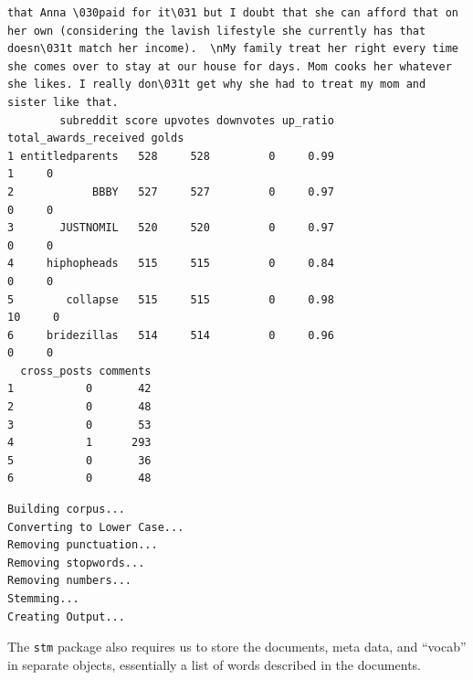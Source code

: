 \documentclass[
  letterpaper,
  DIV=11,
  numbers=noendperiod]{scrreprt}
\newenvironment{Shaded}{\begin{snugshade}}{\end{snugshade}}
\newcommand{\AttributeTok}[1]{\textcolor[rgb]{0.40,0.45,0.13}{#1}}
\newcommand{\CommentTok}[1]{\textcolor[rgb]{0.37,0.37,0.37}{#1}}
\newcommand{\FunctionTok}[1]{\textcolor[rgb]{0.28,0.35,0.67}{#1}}
\newcommand{\NormalTok}[1]{\textcolor[rgb]{0.00,0.23,0.31}{#1}}
\newcommand{\OtherTok}[1]{\textcolor[rgb]{0.00,0.23,0.31}{#1}}
\newcommand{\SpecialCharTok}[1]{\textcolor[rgb]{0.37,0.37,0.37}{#1}}
\begin{document}
\begin{verbatim}
that Anna \030paid for it\031 but I doubt that she can afford that on her own (considering the lavish lifestyle she currently has that doesn\031t match her income).  \nMy family treat her right every time she comes over to stay at our house for days. Mom cooks her whatever she likes. I really don\031t get why she had to treat my mom and sister like that.
        subreddit score upvotes downvotes up_ratio total_awards_received golds
1 entitledparents   528     528         0     0.99                     1     0
2            BBBY   527     527         0     0.97                     0     0
3       JUSTNOMIL   520     520         0     0.97                     0     0
4     hiphopheads   515     515         0     0.84                     0     0
5        collapse   515     515         0     0.98                    10     0
6     bridezillas   514     514         0     0.96                     0     0
  cross_posts comments
1           0       42
2           0       48
3           0       53
4           1      293
5           0       36
6           0       48
\end{verbatim}

\begin{Shaded}
\end{Shaded}

\begin{verbatim}
Building corpus... 
Converting to Lower Case... 
Removing punctuation... 
Removing stopwords... 
Removing numbers... 
Stemming... 
Creating Output... 
\end{verbatim}

The \texttt{stm} package also requires us to store the documents, meta
data, and ``vocab'' in separate objects, essentially a list of words
described in the documents.

\begin{Shaded}
\end{Shaded}
\end{document}
